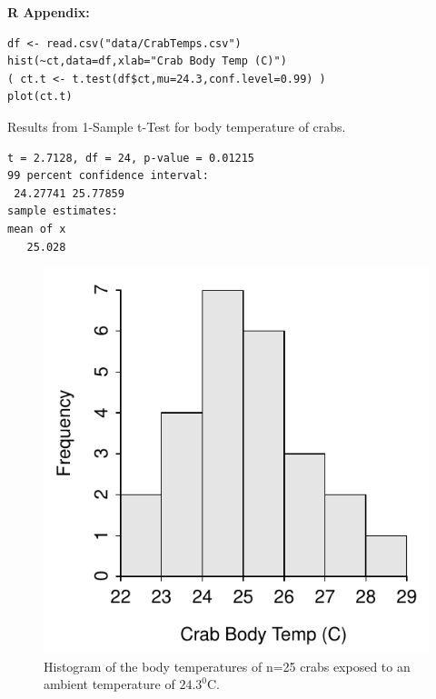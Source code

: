 \documentclass[10pt,openany]{book}\usepackage[]{graphicx}\usepackage[]{color}
\makeatletter
\newenvironment{kframe}{%
 \def\at@end@of@kframe{}%
 \ifinner\ifhmode%
  \def\at@end@of@kframe{\end{minipage}}%
  \begin{minipage}{\columnwidth}%
 \fi\fi%
 \def\FrameCommand##1{\hskip\@totalleftmargin \hskip-\fboxsep
 \colorbox{shadecolor}{##1}\hskip-\fboxsep
     \hskip-\linewidth \hskip-\@totalleftmargin \hskip\columnwidth}%
 \MakeFramed {\advance\hsize-\width
   \@totalleftmargin\z@ \linewidth\hsize
   \@setminipage}}%
 {\par\unskip\endMakeFramed%
 \at@end@of@kframe}
\newenvironment{knitrout}{}{} %
\makeatother
\begin{document}
\begin{minipage}{\textwidth}
\textbf{R Appendix:}
\begin{knitrout}
\color{fgcolor}\begin{kframe}
\begin{verbatim}
df <- read.csv("data/CrabTemps.csv")
hist(~ct,data=df,xlab="Crab Body Temp (C)")
( ct.t <- t.test(df$ct,mu=24.3,conf.level=0.99) )
plot(ct.t)
\end{verbatim}
\end{kframe}
\end{knitrout}
\end{minipage}

\begin{table}[h]
  \caption{Results from 1-Sample t-Test for body temperature of crabs.}
  \label{tab:1tcrabs}
\begin{knitrout}
\color{fgcolor}\begin{kframe}
\begin{verbatim}
t = 2.7128, df = 24, p-value = 0.01215
99 percent confidence interval:
 24.27741 25.77859 
sample estimates:
mean of x 
   25.028 
\end{verbatim}
\end{kframe}
\end{knitrout}
\end{table}

\begin{knitrout}
\color{fgcolor}\begin{figure}[hbtp]

{\centering \includegraphics[width=.3\linewidth]{Figs/CrabTempHist-1} 

}

\caption[Histogram of the body temperatures of n=25 crabs exposed to an ambient temperature of $24.3^{0}$C]{Histogram of the body temperatures of n=25 crabs exposed to an ambient temperature of $24.3^{0}$C.}\label{fig:CrabTempHist}
\end{figure}


\end{knitrout}
\end{document}
